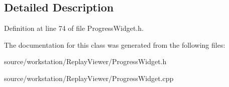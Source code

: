 \subsection{Detailed Description}


Definition at line 74 of file Progress\-Widget.\-h.



The documentation for this class was generated from the following files\-:\begin{DoxyCompactItemize}
\item 
source/workstation/\-Replay\-Viewer/Progress\-Widget.\-h\item 
source/workstation/\-Replay\-Viewer/Progress\-Widget.\-cpp\end{DoxyCompactItemize}
